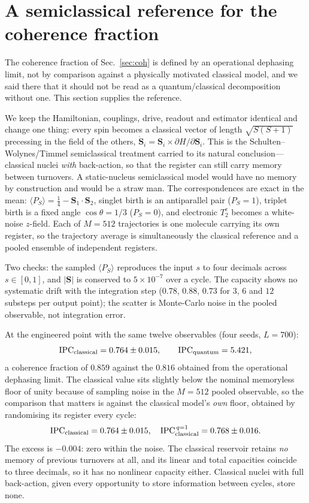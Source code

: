 \documentclass[aps,prx,reprint,superscriptaddress,nofootinbib,floatfix]{revtex4-2}
\begin{document}
\section{A semiclassical reference for the coherence fraction}
\label{sec:semiclassical}
The coherence fraction of Sec.~\ref{sec:coh} is defined by an operational
dephasing limit, not by comparison against a physically motivated classical
model, and we said there that it should not be read as a quantum/classical
decomposition without one. This section supplies the reference.

We keep the Hamiltonian, couplings, drive, readout and estimator identical and
change one thing: every spin becomes a classical vector of length $\sqrt{S(S+1)}$
precessing in the field of the others, $\dot{\bm S}_i=\bm S_i\times\partial
H/\partial\bm S_i$. This is the Schulten--Wolynes/Timmel semiclassical treatment
carried to its natural conclusion---classical nuclei \emph{with} back-action, so
that the register can still carry memory between turnovers. A static-nucleus
semiclassical model would have no memory by construction and would be a straw
man. The correspondences are exact in the mean: $\langle P_S\rangle=\tfrac14-\bm
S_1\!\cdot\!\bm S_2$, singlet birth is an antiparallel pair ($P_S=1$), triplet
birth is a fixed angle $\cos\theta=1/3$ ($P_S=0$), and electronic $T_2^e$ becomes
a white-noise $z$-field. Each of $M=512$ trajectories is one molecule carrying
its own register, so the trajectory average is simultaneously the classical
reference and a pooled ensemble of independent registers.

Two checks: the sampled $\langle P_S\rangle$ reproduces the input $s$ to four
decimals across $s\in[0,1]$, and $|\bm S|$ is conserved to $5\times10^{-7}$ over a
cycle. The capacity shows no systematic drift with the integration step
($0.78$, $0.88$, $0.73$ for $3$, $6$ and $12$ substeps per output point); the
scatter is Monte-Carlo noise in the pooled observable, not integration error.

At the engineered point with the same twelve observables (four seeds,
$L=700$):
\begin{equation*}
\mathrm{IPC}_{\rm classical}=0.764\pm0.015,
\qquad \mathrm{IPC}_{\rm quantum}=5.421 ,
\end{equation*}
a coherence fraction of $0.859$ against the $0.816$ obtained from the operational
dephasing limit. The classical value sits slightly below the nominal memoryless
floor of unity because of sampling noise in the $M=512$ pooled observable, so the
comparison that matters is against the classical model's \emph{own} floor,
obtained by randomising its register every cycle:
\begin{equation*}
\mathrm{IPC}_{\rm classical}=0.764\pm0.015,
\quad
\mathrm{IPC}_{\rm classical}^{\,q=1}=0.768\pm0.016 .
\end{equation*}
The excess is $-0.004$: zero within the noise. The classical reservoir retains
\emph{no} memory of previous turnovers at all, and its linear and total capacities
coincide to three decimals, so it has no nonlinear capacity either. Classical
nuclei with full back-action, given every opportunity to store information
between cycles, store none.
\end{document}
